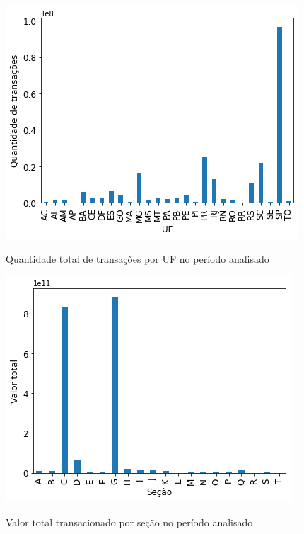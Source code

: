 \begin{figure}[htb]
	\centering
    \caption{Quantidade total de transações por UF no período analisado}
    \includegraphics[scale=0.7]{images/base-de-dados-14.2-transacoes-total-por-uf.png}
    \label{fig:pandemia:descritiva-14.2-transacoes-total-por-uf}
    \fautor
\end{figure}

\begin{figure}[htb]
	\centering
    \caption{Valor total transacionado por seção no período analisado}
    \includegraphics[scale=0.7]{images/base-de-dados-15.1-valor-total-por-secao.png}
    \label{fig:pandemia:descritiva-15.1-valor-total-por-secao}
    \fautor
\end{figure}

